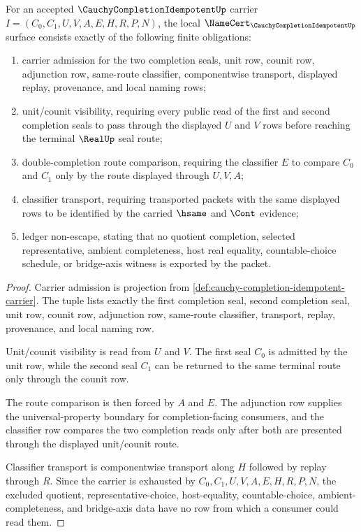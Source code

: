\begin{theorem}
\label{thm:cauchy-completion-idempotent-namecert-obligations}
For an accepted $\CauchyCompletionIdempotentUp$ carrier $I=(C_0,C_1,U,V,A,E,H,R,P,N)$, the local $\NameCert_{\CauchyCompletionIdempotentUp}$ surface consists exactly of the following finite obligations:
\begin{enumerate}
\item carrier admission for the two completion seals, unit row, counit row, adjunction row, same-route classifier, componentwise transport, displayed replay, provenance, and local naming rows;
\item unit/counit visibility, requiring every public read of the first and second completion seals to pass through the displayed $U$ and $V$ rows before reaching the terminal $\RealUp$ seal route;
\item double-completion route comparison, requiring the classifier $E$ to compare $C_0$ and $C_1$ only by the route displayed through $U,V,A$;
\item classifier transport, requiring transported packets with the same displayed rows to be identified by the carried $\hsame$ and $\Cont$ evidence;
\item ledger non-escape, stating that no quotient completion, selected representative, ambient completeness, host real equality, countable-choice schedule, or bridge-axis witness is exported by the packet.
\end{enumerate}
\end{theorem}
\begin{proof}
Carrier admission is projection from \autoref{def:cauchy-completion-idempotent-carrier}. The tuple lists exactly the first completion seal, second completion seal, unit row, counit row, adjunction row, same-route classifier, transport, replay, provenance, and local naming row.

Unit/counit visibility is read from $U$ and $V$. The first seal $C_0$ is admitted by the unit row, while the second seal $C_1$ can be returned to the same terminal route only through the counit row.

The route comparison is then forced by $A$ and $E$. The adjunction row supplies the universal-property boundary for completion-facing consumers, and the classifier row compares the two completion reads only after both are presented through the displayed unit/counit route.

Classifier transport is componentwise transport along $H$ followed by replay through $R$. Since the carrier is exhausted by $C_0,C_1,U,V,A,E,H,R,P,N$, the excluded quotient, representative-choice, host-equality, countable-choice, ambient-completeness, and bridge-axis data have no row from which a consumer could read them.
\end{proof}


